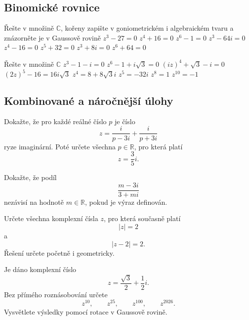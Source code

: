 \subsection*{Binomické rovnice}

\begin{exerciseblock}[2]{Řešte v množině $\mathbb{C}$, kořeny zapište v goniometrickém i algebraickém tvaru a znázorněte je v Gaussově rovině}
    \task $z^3-27=0$
    \task $z^4+16=0$
    \task $z^6-1=0$
    \task $z^3-64i=0$
    \task $z^4-16=0$
    \task $z^5+32=0$
    \task $z^3+8i=0$
    \task $z^6+64=0$
\end{exerciseblock}


\begin{exerciseblock}[2]{Řešte v množině $\mathbb{C}$}
    \task $z^3-1-i=0$
    \task $z^6-1+i\sqrt3=0$
    \task $(iz)^4+\sqrt3-i=0$
    \task $(2z)^5-16=16i\sqrt3$
    \task $z^4=8+8\sqrt3 i$
    \task $z^5=-32i$
    \task $z^8=1$
    \task $z^{10}=-1$
\end{exerciseblock}



\subsection*{Kombinované a náročnější úlohy}

\begin{exercise}{Dokažte, že pro každé reálné číslo $p$ je číslo
\[
    z=\frac{i}{p-3i}+\frac{i}{p+3i}
\]
ryze imaginární. Poté určete všechna $p\in\mathbb{R}$, pro která platí
\[
    z=\frac35i.
\]}
\end{exercise}


\begin{exercise}{Dokažte, že podíl
\[
    \frac{m-3i}{3+mi}
\]
nezávisí na hodnotě $m\in\mathbb{R}$, pokud je výraz definován.}
\end{exercise}


\begin{exercise}{Určete všechna komplexní čísla $z$, pro která současně platí
\[
    |z|=2
\]
a
\[
    |z-2|=2.
\]
Řešení určete početně i geometricky.}
\end{exercise}


\begin{exercise}{Je dáno komplexní číslo
\[
    z=\frac{\sqrt3}{2}+\frac12i.
\]
Bez přímého roznásobování určete
\[
    z^{10},\qquad z^{25},\qquad z^{100},\qquad z^{2026}.
\]
Vysvětlete výsledky pomocí rotace v Gaussově rovině.}
\end{exercise}


